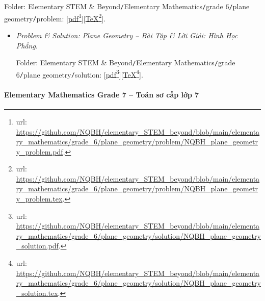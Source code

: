 \documentclass[12pt]{article}
\begin{document}
\begin{enumerate}
	Folder: {\sf Elementary STEM \& Beyond{\tt/}Elementary Mathematics{\tt/}grade 6{\tt/}plane geometry{\tt/}problem}: [\href{https://github.com/NQBH/elementary_STEM_beyond/blob/main/elementary_mathematics/grade_6/plane_geometry/problem/NQBH_plane_geometry_problem.pdf}{pdf}\footnote{{\sc url}: \url{https://github.com/NQBH/elementary_STEM_beyond/blob/main/elementary_mathematics/grade_6/plane_geometry/problem/NQBH_plane_geometry_problem.pdf}.}][\href{https://github.com/NQBH/elementary_STEM_beyond/blob/main/elementary_mathematics/grade_6/plane_geometry/problem/NQBH_plane_geometry_problem.tex}{\TeX}\footnote{{\sc url}: \url{https://github.com/NQBH/elementary_STEM_beyond/blob/main/elementary_mathematics/grade_6/plane_geometry/problem/NQBH_plane_geometry_problem.tex}.}].
	\begin{itemize}
		\item {\it Problem \& Solution: Plane Geometry -- Bài Tập \& Lời Giải: Hình Học Phẳng}.
		
		Folder: {\sf Elementary STEM \& Beyond{\tt/}Elementary Mathematics{\tt/}grade 6{\tt/}plane geometry{\tt/}solution}: [\href{https://github.com/NQBH/elementary_STEM_beyond/blob/main/elementary_mathematics/grade_6/plane_geometry/solution/NQBH_plane_geometry_solution.pdf}{pdf}\footnote{{\sc url}: \url{https://github.com/NQBH/elementary_STEM_beyond/blob/main/elementary_mathematics/grade_6/plane_geometry/solution/NQBH_plane_geometry_solution.pdf}.}][\href{https://github.com/NQBH/elementary_STEM_beyond/blob/main/elementary_mathematics/grade_6/plane_geometry/solution/NQBH_plane_geometry_solution.tex}{\TeX}\footnote{{\sc url}: \url{https://github.com/NQBH/elementary_STEM_beyond/blob/main/elementary_mathematics/grade_6/plane_geometry/solution/NQBH_plane_geometry_solution.tex}.}].
	\end{itemize}
\end{enumerate}

\paragraph{Elementary Mathematics Grade 7 -- Toán sơ cấp lớp 7}
\end{document}
